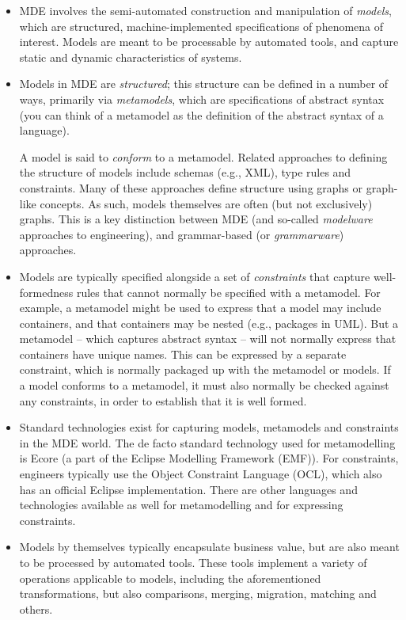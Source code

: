 \begin{itemize}
\item MDE involves the semi-automated construction and manipulation of \textit{models}, which are structured, machine-implemented specifications of phenomena of interest. Models are meant to be processable by automated tools, and capture static and dynamic characteristics of systems. 

\item Models in MDE are \textit{structured}; this structure can be defined in a number of ways, primarily via \textit{metamodels}, which are specifications of abstract syntax (you can think of a metamodel as the definition of the abstract syntax of a language). 

A model is said to \textit{conform} to a metamodel. Related approaches to defining the structure of models include schemas (e.g., XML), type rules and constraints. Many of these approaches define structure using graphs or graph-like concepts. As such, models themselves are often (but not exclusively) graphs. This is a key distinction between MDE (and so-called \textit{modelware} approaches to engineering), and grammar-based (or \textit{grammarware}) approaches.

\item Models are typically specified alongside a set of \textit{constraints} that capture well-formedness rules that cannot normally be specified with a metamodel. For example, a metamodel might be used to express that a model may include containers, and that containers may be nested (e.g., packages in UML). But a metamodel -- which captures abstract syntax -- will not normally express that containers have unique names. This can be expressed by a separate constraint, which is normally packaged up with the metamodel or models. If a model conforms to a metamodel, it must also normally be checked against any constraints, in order to establish that it is well formed.

\item Standard technologies exist for capturing models, metamodels and constraints in the MDE world. The de facto standard technology used for metamodelling is Ecore (a part of the Eclipse Modelling Framework (EMF)). For constraints, engineers typically use the Object Constraint Language (OCL), which also has an official Eclipse implementation. There are other languages and technologies available as well for metamodelling and for expressing constraints.

\item Models by themselves typically encapsulate business value, but are also meant to be processed by automated tools. These tools implement a variety of operations applicable to models, including the aforementioned transformations, but also comparisons, merging, migration, matching and others.
\end{itemize}

